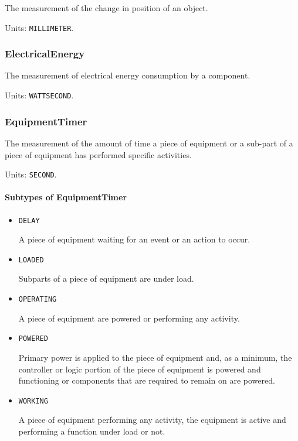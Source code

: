 The measurement of the change in position of an object.


Units: \texttt{MILLIMETER}.

\subsubsection{ElectricalEnergy}
\label{sec:ElectricalEnergy}



The measurement of electrical energy consumption by a component.


Units: \texttt{WATT\textunderscore SECOND}.

\subsubsection{EquipmentTimer}
\label{sec:EquipmentTimer}



The measurement of the amount of time a piece of equipment or a sub-part of a piece of equipment has performed specific activities.


Units: \texttt{SECOND}.

\paragraph{Subtypes of EquipmentTimer}\mbox{}
\label{sec:Subtypes of EquipmentTimer}

\begin{itemize}

\item \texttt{DELAY}


A piece of equipment waiting for an event or an action to occur.

\item \texttt{LOADED}


Subparts of a piece of equipment are under load.

\item \texttt{OPERATING}


A piece of equipment are powered or performing any activity.

\item \texttt{POWERED}


Primary  power is  applied  to the  piece  of  equipment and,  as  a minimum, the controller or logic portion of the piece of equipment is powered and functioning or components that are required to remain on are powered.

\item \texttt{WORKING}


A piece of equipment performing any activity, the equipment is active and performing a function under load or not.


\end{itemize}

